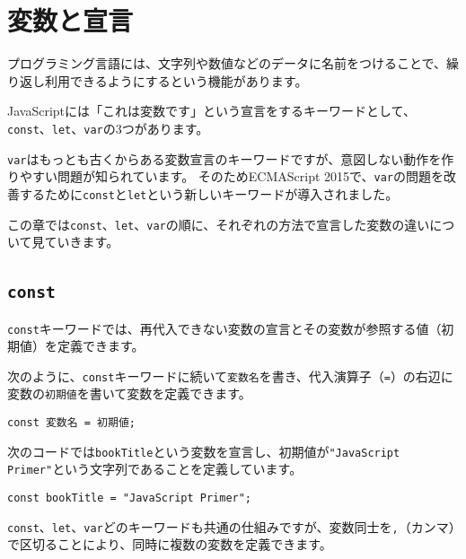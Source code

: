 \hypertarget{variable-and-declaration}{%
\chapter{変数と宣言}\label{variable-and-declaration}}
\thispagestyle{frontheadings}

プログラミング言語には、文字列や数値などのデータに名前をつけることで、繰り返し利用できるようにする\textbf{}という機能があります。

JavaScriptには「これは変数です」という宣言をするキーワードとして、
\texttt{const}、\texttt{let}、\texttt{var}の3つがあります。

\texttt{var}はもっとも古くからある変数宣言のキーワードですが、意図しない動作を作りやすい問題が知られています。
そのためECMAScript
2015で、\texttt{var}の問題を改善するために\texttt{const}と\texttt{let}という新しいキーワードが導入されました。

この章では\texttt{const}、\texttt{let}、\texttt{var}の順に、それぞれの方法で宣言した変数の違いについて見ていきます。

\hypertarget{const}{%
\section[\texttt{const}]{\texttt{const}\,\protect{}}\label{const}}

\texttt{const}キーワードでは、再代入できない変数の宣言とその変数が参照する値（初期値）を定義できます。

次のように、\texttt{const}キーワードに続いて\texttt{変数名}を書き、代入演算子（\texttt{=}）の右辺に変数の\texttt{初期値}を書いて変数を定義できます。

\begin{lstlisting}
const 変数名 = 初期値;
\end{lstlisting}

次のコードでは\texttt{bookTitle}という変数を宣言し、初期値が\texttt{"JavaScript Primer"}という文字列であることを定義しています。

\begin{lstlisting}
const bookTitle = "JavaScript Primer";
\end{lstlisting}

\texttt{const}、\texttt{let}、\texttt{var}どのキーワードも共通の仕組みですが、変数同士を\texttt{,}（カンマ）で区切ることにより、同時に複数の変数を定義できます。

